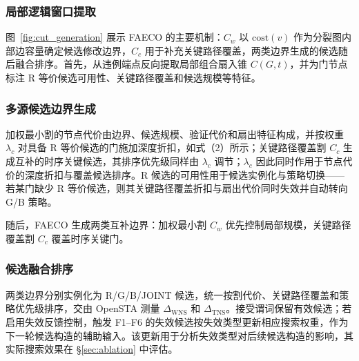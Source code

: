 \documentclass[twocolumn,10pt,fontset=windows]{ctexart}
\begin{document}
\subsubsection{局部逻辑窗口提取}
图~\ref{fig:cut_generation} 展示 FAECO 的主要机制：$C_w$ 以 $\mathrm{cost}(v)$ 作为分裂图内部边容量确定候选修改边界，$C_c$ 用于补充关键路径覆盖，两类边界生成的候选随后融合排序。首先，从违例端点反向提取局部组合扇入锥 $C(G,t)$，并为门节点标注 R 等价候选可用性、关键路径覆盖和候选规模等特征。

\subsubsection{多源候选边界生成}
加权最小割的节点代价由边界、候选规模、验证代价和扇出特征构成，并按权重 $\lambda_c$ 对具备 R 等价候选的门施加深度折扣，如式（2）所示；关键路径覆盖割 $C_c$ 生成互补的时序关键候选，其排序优先级同样由 $\lambda_c$ 调节；$\lambda_c$ 因此同时作用于节点代价的深度折扣与覆盖候选排序。R 候选的可用性用于候选实例化与策略切换——若某门缺少 R 等价候选，则其关键路径覆盖折扣与扇出代价同时失效并自动转向 G/B 策略。

随后，FAECO 生成两类互补边界：加权最小割 $C_w$ 优先控制局部规模，关键路径覆盖割 $C_c$ 覆盖时序关键门。

\subsubsection{候选融合排序}
两类边界分别实例化为 R/G/B/JOINT 候选，统一按割代价、关键路径覆盖和策略优先级排序，交由 OpenSTA 测量 $\Delta_{\mathrm{WNS}}$ 和 $\Delta_{\mathrm{TNS}}$。接受谓词保留有效候选；若启用失效反馈控制，触发 F1--F6 的失效候选按失效类型更新相应搜索权重，作为下一轮候选构造的辅助输入。该更新用于分析失效类型对后续候选构造的影响，其实际搜索效果在 \S\ref{sec:ablation} 中评估。
\end{document}
